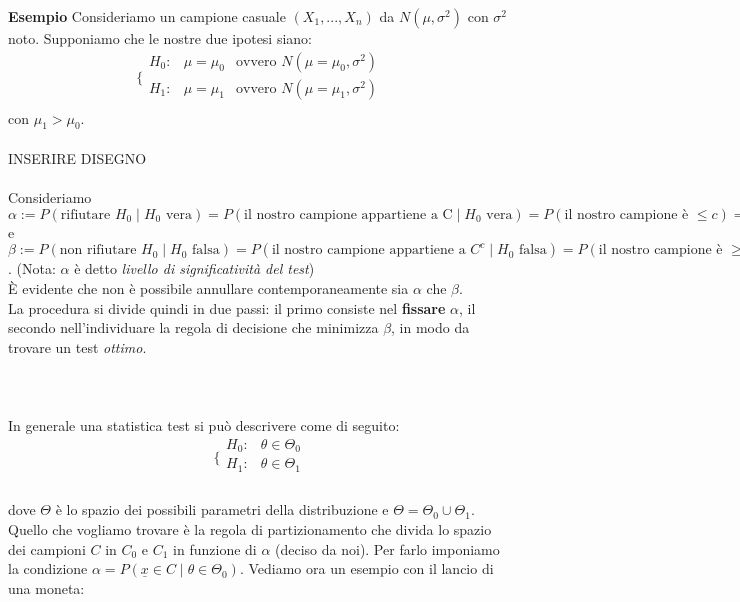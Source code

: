 \noindent \textbf{Esempio} Consideriamo un campione casuale $(X_1,...,X_n)$ da $N(\mu,\sigma^2)$ con $\sigma^2$ noto. Supponiamo che le nostre due ipotesi siano:
\\
$$\bigg \{
\begin{array}{lcr}
H_0: & \mu=\mu_0 & \text{ovvero } N(\mu=\mu_0,\sigma^2) \\
H_1: & \mu=\mu_1 & \text{ovvero } N(\mu=\mu_1,\sigma^2) \\
\end{array}
$$
con $\mu_1 > \mu_0$.\\
\\
INSERIRE DISEGNO\\
\\
Consideriamo $\alpha:= P(\text{rifiutare } H_0 \mid H_0 \text{ vera}) = P(\text{il nostro campione appartiene a C} \mid H_0 \text{ vera}) = P(\text{il nostro campione è } \leq c) = P(\text{commettere un errore di I tipo})$ e $\beta:= P(\text{non rifiutare } H_0 \mid H_0 \text{ falsa}) = P(\text{il nostro campione appartiene a } C^c \mid H_0 \text{ falsa}) = P(\text{il nostro campione è } \geq c) = P(\text{commettere un errore di II tipo})$. 
(Nota: $\alpha$ è detto \emph{livello di significatività del test})\\
È evidente che non è possibile annullare contemporaneamente sia $\alpha$ che $\beta$.\\
La procedura si divide quindi in due passi: il primo consiste nel \textbf{fissare} $\alpha$, il secondo nell'individuare la regola di decisione che minimizza $\beta$, in modo da trovare un test \textit{ottimo}.\\
\\
\\
\\
In generale una statistica test si può descrivere come di seguito:\\
$$\bigg \{
\begin{array}{rl}
H_0: & \theta \in \Theta_0 \\
H_1: & \theta \in \Theta_1 \\
\end{array}
$$
\\
dove $\Theta$ è lo spazio dei possibili parametri della distribuzione e $\Theta = \Theta_0 \cup \Theta_1$.\\
Quello che vogliamo trovare è la regola di partizionamento che divida lo spazio dei campioni $C$ in $C_0$ e $C_1$ in funzione di $\alpha$ (deciso da noi). Per farlo imponiamo la condizione $\alpha = P(\underline{x} \in C \mid \theta \in \Theta_0)$. Vediamo ora un esempio con il lancio di una moneta:\\
